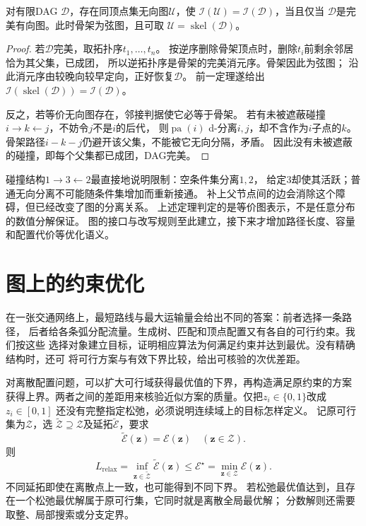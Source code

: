 \begin{theorem}[有向图的完美无向图表示]
  \label{thm:graph-theory-perfect-undirected}
  对有限DAG \(\mathcal D\)，存在同顶点集无向图\(\mathcal U\)，使
  \(\mathcal I(\mathcal U)=\mathcal I(\mathcal D)\)，当且仅当
  \(\mathcal D\)是完美有向图。此时骨架为弦图，且可取
  \(\mathcal U=\operatorname{skel}(\mathcal D)\)。
\end{theorem}

\begin{proof}
若\(\mathcal D\)完美，取拓扑序\(t_1,\ldots,t_n\)。
按逆序删除骨架顶点时，删除\(t_i\)前剩余邻居恰为其父集，已成团，
所以逆拓扑序是骨架的完美消元序。骨架因此为弦图；
沿此消元序由较晚向较早定向，正好恢复\(\mathcal D\)。
前一定理遂给出
\(\mathcal I(\operatorname{skel}(\mathcal D))=\mathcal I(\mathcal D)\)。

反之，若等价无向图存在，邻接判据使它必等于骨架。
若有未被遮蔽碰撞\(i\to k\leftarrow j\)，不妨令\(j\)不是\(i\)的后代，
则\(\operatorname{pa}(i)\) d-分离\(i,j\)，却不含作为\(i\)子点的\(k\)。
骨架路径\(i-k-j\)仍避开该父集，不能被它无向分隔，矛盾。
因此没有未被遮蔽的碰撞，即每个父集都已成团，DAG完美。
\end{proof}

碰撞结构\(1\to3\leftarrow2\)最直接地说明限制：空条件集分离\(1,2\)，
给定\(3\)却使其活跃；普通无向分离不可能随条件集增加而重新接通。
补上父节点间的边会消除这个障碍，但已经改变了图的分离关系。
上述定理判定的是等价图表示，不是任意分布的数值分解保证。
图的接口与改写规则至此建立，接下来才增加路径长度、容量和配置代价等优化语义。

\section{图上的约束优化}
\label{sec:graph-theory-exact-approximate-algorithms}

在一张交通网络上，最短路线与最大运输量会给出不同的答案：前者选择一条路径，
后者给各条弧分配流量。生成树、匹配和顶点配置又有各自的可行约束。我们按这些
选择对象建立目标，证明相应算法为何满足约束并达到最优。没有精确结构时，还可
将可行方案与有效下界比较，给出可核验的次优差距。

对离散配置问题，可以扩大可行域获得最优值的下界，再构造满足原约束的方案
获得上界。两者之间的差距用来核验近似方案的质量。仅把\(z_i\in\{0,1\}\)改成\(z_i\in[0,1]\)
还没有完整指定松弛，必须说明连续域上的目标怎样定义。
记原可行集为\(\mathcal Z\)，选
\(\widetilde{\mathcal Z}\supseteq\mathcal Z\)及延拓\(\widetilde{\mathcal E}\)，要求
\[
  \widetilde{\mathcal E}(\bm z)=\mathcal E(\bm z)\quad(\bm z\in\mathcal Z).
\]
则
\[
  L_{\mathrm{relax}}
  =\inf_{\bm z\in\widetilde{\mathcal Z}}\widetilde{\mathcal E}(\bm z)
  \leq \mathcal E^\star
  =\min_{\bm z\in\mathcal Z}\mathcal E(\bm z).
\]
不同延拓即使在离散点上一致，也可能得到不同下界。
若松弛最优值达到，且存在一个松弛最优解属于原可行集，它同时就是离散全局最优解；
分数解则还需要取整、局部搜索或分支定界。

